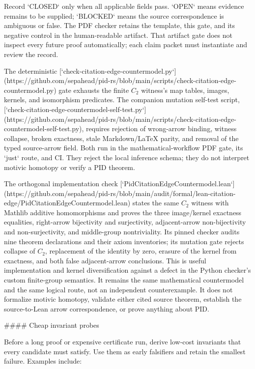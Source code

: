 \documentclass[11pt]{article}
\begin{document}
\begin{markdown}
Record `CLOSED` only when all applicable fields pass. `OPEN` means evidence remains to be supplied;
`BLOCKED` means the source correspondence is ambiguous or false. The PDF checker retains the
template, this gate, and its negative control in the human-readable artifact. That artifact gate
does not inspect every future proof automatically; each claim packet must instantiate and review
the record.

The deterministic
[`check-citation-edge-countermodel.py`](https://github.com/sepahead/pid-rs/blob/main/scripts/check-citation-edge-countermodel.py) gate exhausts
the finite $C_2$ witness's map tables, images, kernels, and isomorphism predicates. The companion
mutation self-test script,
[`check-citation-edge-countermodel-self-test.py`](https://github.com/sepahead/pid-rs/blob/main/scripts/check-citation-edge-countermodel-self-test.py),
requires rejection of wrong-arrow binding, witness collapse, broken exactness, stale
Markdown/LaTeX parity, and removal of the typed source-arrow field. Both run in the
mathematical-workflow PDF gate, its `just` route, and CI. They reject the local inference schema;
they do not interpret motivic homotopy or verify a PID theorem.

The orthogonal implementation check
[`PidCitationEdgeCountermodel.lean`](https://github.com/sepahead/pid-rs/blob/main/audit/formal/lean-citation-edge/PidCitationEdgeCountermodel.lean)
states the same $C_2$ witness with Mathlib additive homomorphisms and proves the three
image/kernel exactness equalities, right-arrow bijectivity and surjectivity, adjacent-arrow
non-bijectivity and non-surjectivity, and middle-group nontriviality. Its pinned checker audits
nine theorem declarations and their axiom inventories; its mutation gate rejects collapse of
$C_2$, replacement of the identity by zero, erasure of the kernel from exactness, and both false
adjacent-arrow conclusions. This is useful implementation and kernel diversification against a
defect in the Python checker's custom finite-group semantics. It remains the same mathematical
countermodel and the same logical route, not an independent counterexample. It does not formalize
motivic homotopy, validate either cited source theorem, establish the source-to-Lean arrow
correspondence, or prove anything about PID.

#### Cheap invariant probes

Before a long proof or expensive certificate run, derive low-cost invariants that every candidate
must satisfy. Use them as early falsifiers and retain the smallest failure. Examples include:


\end{markdown}
\end{document}
